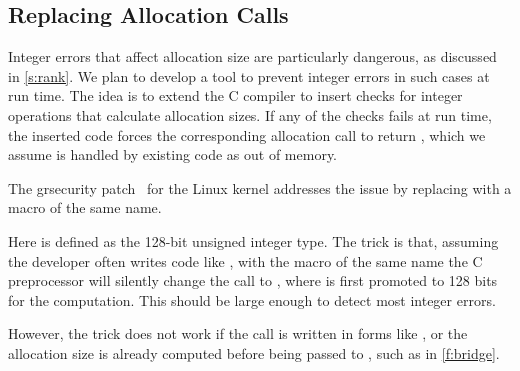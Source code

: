 \subsection{Replacing Allocation Calls}

Integer errors that affect allocation size are particularly dangerous,
as discussed in \autoref{s:rank}.
We plan to develop a tool to prevent integer errors
in such cases at run time.
The idea is to extend the C compiler
to insert checks for integer operations that calculate allocation sizes.
If any of the checks fails at run time,
the inserted code forces the corresponding allocation call to return
, which we assume is handled by existing code
as out of memory.

\fi

The grsecurity patch~\cite{grsecurity}
for the Linux kernel addresses the issue by replacing
 with a macro of the same name.
%

%
Here  is defined as the 128-bit unsigned integer
type.  The trick is that, assuming the developer often writes code
like , with the macro of the same name
the C preprocessor will silently change the call to
, where  is first
promoted to 128 bits for the computation.  This should be large
enough to detect most integer errors.

However, the trick does not work if the call is written in forms
like , or the allocation
size is already computed before being passed to , such
as in \autoref{f:bridge}.
\fi
